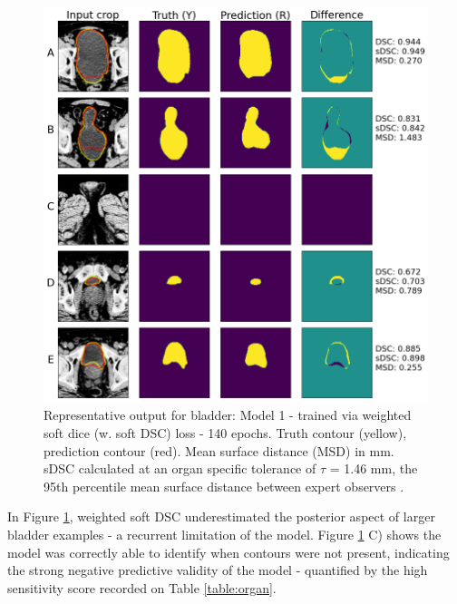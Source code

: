 \begin{figure}[H]
	\begin{center}
		\includegraphics[width=1.0\textwidth]{figures/prostate_bladder}
		\caption{Representative output for bladder: Model 1 - trained via weighted
      soft dice (w. soft DSC) loss - 140 epochs. Truth contour (yellow),
      prediction contour (red). Mean surface distance (MSD) in mm. sDSC
      \cite{Nikolov_2018} calculated at an organ specific tolerance of $\tau$ =
      1.46 mm, the 95th percentile mean surface distance between expert
      observers \cite{Roach_2019}.}
		\label{fig:prostate_bladder}
	\end{center}
\end{figure}

In Figure \ref{fig:prostate_bladder}, weighted soft DSC underestimated the
posterior aspect of larger bladder examples - a recurrent limitation of the
model. Figure \ref{fig:prostate_bladder} C) shows the model was correctly able
to identify when contours were not present, indicating the strong negative
predictive validity of the model - quantified by the high sensitivity score
recorded on Table \ref{table:organ}.


